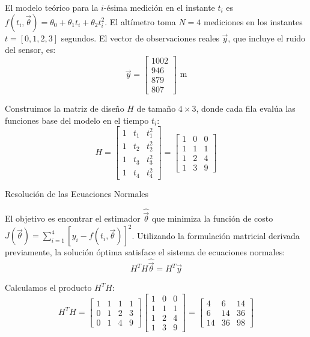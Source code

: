El modelo teórico para la $i$-ésima medición en el instante $t_i$ es $f(t_i, \vec{\theta}) = \theta_0 + \theta_1 t_i + \theta_2 t_i^2$. 
El altímetro toma $N=4$ mediciones en los instantes $t = [0, 1, 2, 3]$ segundos. El vector de observaciones reales $\vec{y}$, que incluye el ruido del sensor, es:
$$ \vec{y} = \begin{bmatrix} 1002 \\ 946 \\ 879 \\ 807 \end{bmatrix} \text{ m} $$

Construimos la matriz de diseño $H$ de tamaño $4 \times 3$, donde cada fila evalúa las funciones base del modelo en el tiempo $t_i$:
$$ H = \begin{bmatrix} 1 & t_1 & t_1^2 \\ 1 & t_2 & t_2^2 \\ 1 & t_3 & t_3^2 \\ 1 & t_4 & t_4^2 \end{bmatrix} = \begin{bmatrix} 1 & 0 & 0 \\ 1 & 1 & 1 \\ 1 & 2 & 4 \\ 1 & 3 & 9 \end{bmatrix} $$

Resolución de las Ecuaciones Normales

El objetivo es encontrar el estimador $\hat{\vec{\theta}}$ que minimiza la función de costo $J(\vec{\theta}) = \sum_{i=1}^{4} [y_i - f(t_i, \vec{\theta})]^2$. Utilizando la formulación matricial derivada previamente, la solución óptima satisface el sistema de ecuaciones normales:
$$ H^T H \hat{\vec{\theta}} = H^T \vec{y} $$

Calculamos el producto $H^T H$:
$$ H^T H = \begin{bmatrix} 1 & 1 & 1 & 1 \\ 0 & 1 & 2 & 3 \\ 0 & 1 & 4 & 9 \end{bmatrix} \begin{bmatrix} 1 & 0 & 0 \\ 1 & 1 & 1 \\ 1 & 2 & 4 \\ 1 & 3 & 9 \end{bmatrix} = \begin{bmatrix} 4 & 6 & 14 \\ 6 & 14 & 36 \\ 14 & 36 & 98 \end{bmatrix} $$

